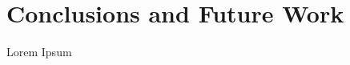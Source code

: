 \chapter[Conclusions and Future Work]{Conclusions and Future Work}\label{ch:conclusions}

Lorem Ipsum




